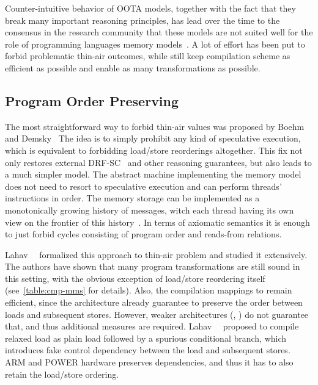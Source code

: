 Counter-intuitive behavior of OOTA models, together with the fact that they break 
many important reasoning principles,
has lead over the time to the consensus in the research community that these models 
are not suited well for the role of 
programming languages memory models~\cite{Boehm-Demsky:MSPC14, Batty-al:ESOP15}.
A lot of effort has been put to forbid problematic 
thin-air outcomes, while still keep compilation scheme as efficient as possible
and enable as many transformations as possible.

\subsection{Program Order Preserving}
\label{sec:analysis:porf}

The most straightforward way to forbid thin-air values 
was proposed by Boehm and Demsky~\cite{Boehm-Demsky:MSPC14}
The idea is to simply prohibit any kind of speculative execution, 
which is equivalent to forbidding load/store reorderings altogether. 
This fix not only restores external DRF-SC~\cite{Lahav-al:PLDI17}
and other reasoning guarantees, but also leads to 
a much simpler model. The abstract machine implementing 
the memory model does not need to resort to speculative execution 
and can perform threads' instructions in order. 
The memory storage can be implemented as a 
monotonically growing history of messages, 
witch each thread having its own view on 
the frontier of this history~\cite{Dolan-al:PLDI18, Doherty-al:PPoPP19}.
In terms of axiomatic semantics it is enough to just
forbid cycles consisting of program order and reads-from relations. 

Lahav~\etal~\cite{Lahav-al:PLDI17} formalized this approach
to thin-air problem and studied it extensively. 
The authors have shown that many 
program transformations are still sound in this setting, 
with the obvious exception of load/store reordering itself
(see~\cref{table:cmp-mms} for details).
Also, the compilation mappings to \xTSO remain efficient, 
since the architecture already guarantee to preserve the order 
between loads and subsequent stores. 
However, weaker architectures (\ARM, \POWER) do not guarantee that, 
and thus additional measures are required.
Lahav~\etal~\cite{Lahav-al:PLDI17} proposed to compile relaxed load 
as plain load followed by a spurious conditional branch,
which introduces fake control dependency between 
the load and subsequent stores. 
ARM and POWER hardware preserves dependencies, 
and thus it has to also retain the load/store ordering. 

